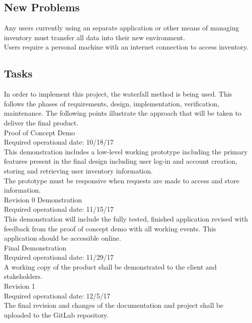 \documentclass[12pt, titlepage]{article}
\begin{document}
\subsection{New Problems}
Any users currently using an separate application or other means of managing inventory must transfer all data into their new environment.\\
Users require a personal machine with an internet connection to access inventory.\\

\subsection{Tasks}
In order to implement this project, the waterfall method is being used. This follows the phases of requirements, design, implementation, verification, maintenance. The following points illustrate the approach that will be taken to deliver the final product.\\

\noindent Proof of Concept Demo\\
Required operational date: 10/18/17\\
This demonstration includes a low-level working prototype including the primary features present in the final design including user log-in and account creation, storing and retrieving user inventory information.\\
The prototype must be responsive when requests are made to access and store information.\\

\noindent Revision 0 Demonstration\\
Required operational date: 11/15/17\\
This demonstration will include the fully tested, finished application revised with feedback from the proof of concept demo with all working events. This application should be accessible online. \\

\noindent Final Demonstration\\
Required operational date: 11/29/17\\
A working copy of the product shall be demonstrated to the client and stakeholders.\\

\noindent Revision 1\\
Required operational date: 12/5/17\\
The final revision and changes of the documentation and project shall be uploaded to the GitLab repository.\\
\end{document}
